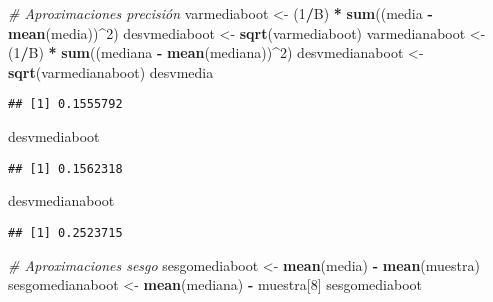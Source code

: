 \documentclass[
]{book}
\newenvironment{Shaded}{\begin{snugshade}}{\end{snugshade}}
\newcommand{\CommentTok}[1]{\textcolor[rgb]{0.56,0.35,0.01}{\textit{#1}}}
\newcommand{\DecValTok}[1]{\textcolor[rgb]{0.00,0.00,0.81}{#1}}
\newcommand{\KeywordTok}[1]{\textcolor[rgb]{0.13,0.29,0.53}{\textbf{#1}}}
\newcommand{\NormalTok}[1]{#1}
\newcommand{\OperatorTok}[1]{\textcolor[rgb]{0.81,0.36,0.00}{\textbf{#1}}}
\newcommand{\StringTok}[1]{\textcolor[rgb]{0.31,0.60,0.02}{#1}}
\theoremstyle{break}
\theoremstyle{definition}
\theoremstyle{definition}
\theoremstyle{definition}
\theoremstyle{remark}
\begin{document}
\begin{Shaded}
\begin{Highlighting}[]
\CommentTok{# Aproximaciones precisión}
\NormalTok{varmediaboot <-}\StringTok{ }\NormalTok{(}\DecValTok{1}\OperatorTok{/}\NormalTok{B) }\OperatorTok{*}\StringTok{ }\KeywordTok{sum}\NormalTok{((media }\OperatorTok{-}\StringTok{ }\KeywordTok{mean}\NormalTok{(media))}\OperatorTok{^}\DecValTok{2}\NormalTok{)}
\NormalTok{desvmediaboot <-}\StringTok{ }\KeywordTok{sqrt}\NormalTok{(varmediaboot)}
\NormalTok{varmedianaboot <-}\StringTok{ }\NormalTok{(}\DecValTok{1}\OperatorTok{/}\NormalTok{B) }\OperatorTok{*}\StringTok{ }\KeywordTok{sum}\NormalTok{((mediana }\OperatorTok{-}\StringTok{ }\KeywordTok{mean}\NormalTok{(mediana))}\OperatorTok{^}\DecValTok{2}\NormalTok{)}
\NormalTok{desvmedianaboot <-}\StringTok{ }\KeywordTok{sqrt}\NormalTok{(varmedianaboot)}
\NormalTok{desvmedia}
\end{Highlighting}
\end{Shaded}

\begin{verbatim}
## [1] 0.1555792
\end{verbatim}

\begin{Shaded}
\begin{Highlighting}[]
\NormalTok{desvmediaboot}
\end{Highlighting}
\end{Shaded}

\begin{verbatim}
## [1] 0.1562318
\end{verbatim}

\begin{Shaded}
\begin{Highlighting}[]
\NormalTok{desvmedianaboot}
\end{Highlighting}
\end{Shaded}

\begin{verbatim}
## [1] 0.2523715
\end{verbatim}

\begin{Shaded}
\begin{Highlighting}[]
\CommentTok{# Aproximaciones sesgo}
\NormalTok{sesgomediaboot <-}\StringTok{ }\KeywordTok{mean}\NormalTok{(media) }\OperatorTok{-}\StringTok{ }\KeywordTok{mean}\NormalTok{(muestra)}
\NormalTok{sesgomedianaboot <-}\StringTok{ }\KeywordTok{mean}\NormalTok{(mediana) }\OperatorTok{-}\StringTok{ }\NormalTok{muestra[}\DecValTok{8}\NormalTok{]}
\NormalTok{sesgomediaboot}
\end{Highlighting}
\end{Shaded}
\end{document}

